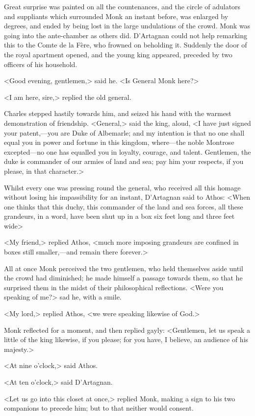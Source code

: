 Great surprise was painted on all the countenances, and the circle of adulators and suppliants which surrounded Monk an instant before, was enlarged by degrees, and ended by being lost in the large undulations of the crowd. Monk was going into the ante-chamber as others did. D'Artagnan could not help remarking this to the Comte de la Fère, who frowned on beholding it. Suddenly the door of the royal apartment opened, and the young king appeared, preceded by two officers of his household.

<Good evening, gentlemen,> said he. <Is General Monk here?>

<I am here, sire,> replied the old general.

Charles stepped hastily towards him, and seized his hand with the warmest demonstration of friendship. <General,> said the king, aloud, <I have just signed your patent,—you are Duke of Albemarle; and my intention is that no one shall equal you in power and fortune in this kingdom, where—the noble Montrose excepted—no one has equalled you in loyalty, courage, and talent. Gentlemen, the duke is commander of our armies of land and sea; pay him your respects, if you please, in that character.>

Whilst every one was pressing round the general, who received all this homage without losing his impassibility for an instant, D'Artagnan said to Athos: <When one thinks that this duchy, this commander of the land and sea forces, all these grandeurs, in a word, have been shut up in a box six feet long and three feet wide\longdash>

<My friend,> replied Athos, <much more imposing grandeurs are confined in boxes still smaller,—and remain there forever.>

All at once Monk perceived the two gentlemen, who held themselves aside until the crowd had diminished; he made himself a passage towards them, so that he surprised them in the midst of their philosophical reflections. <Were you speaking of me?> sad he, with a smile.

<My lord,> replied Athos, <we were speaking likewise of God.>

Monk reflected for a moment, and then replied gayly: <Gentlemen, let us speak a little of the king likewise, if you please; for you have, I believe, an audience of his majesty.>

<At nine o'clock,> said Athos.

<At ten o'clock,> said D'Artagnan.

<Let us go into this closet at once,> replied Monk, making a sign to his two companions to precede him; but to that neither would consent.

